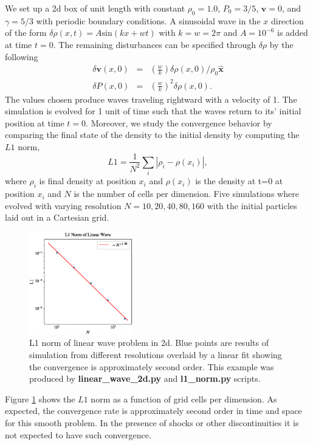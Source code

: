 We set up a 2d box of unit length with constant $\rho_0=1.0$, $P_0=3/5$, $\mathbf{v}=0$,
and $\gamma=5/3$ with periodic boundary conditions. A sinusoidal wave in the $x$ direction of 
the form $\delta\rho(x,t) = A\mathrm{sin}(kx + wt)$ with $k=w=2\pi$ and $A=10^{-6}$ is added at 
time $t=0$. The remaining disturbances can be specified through $\delta\rho$ by the following
\begin{equation}
	\begin{array}{rcl}
        \delta \mathbf{v}(x,0) & = & \left(\frac{w}{k}\right)\delta
        	\rho(x,0)/\rho_0\mathbf{\hat{x}}\\
        \delta P(x,0) & = & \left(\frac{w}{k}\right)^2\delta\rho(x,0).
    \end{array}
\end{equation}
The values chosen produce waves traveling rightward with a velocity of 1. The simulation is
evolved for 1 unit of time such that the waves return to its' initial position at time $t=0$. 
Moreover, we study the convergence behavior by comparing the final state of the density to 
the initial density by computing the $L1$ norm,
\begin{equation}
	L1 = \frac{1}{N^2}\sum_i \left| \rho_i - \rho(x_i) \right|,
\end{equation}
where $\rho_i$ is final density at position $x_i$ and $\rho(x_i)$ is the density at t=0
at position $x_i$ and $N$ is the number of cells per dimension. Five simulations where evolved
with varying resolution $N=10, 20, 40, 80, 160$ with the initial particles laid out in a
Cartesian grid.
\begin{figure}
    \begin{center}
        \includegraphics[width=0.4\textwidth]{figures/linear-wave-l1.eps}
        \caption{L1 norm of linear wave problem in 2d. Blue points are results
        of simulation from different resolutions overlaid by a linear fit showing
        the convergence is approximately second order. This example was produced by
        \textbf{linear\_wave\_2d.py} and \textbf{l1\_norm.py} scripts.}
        \label{fig.linear-wave}
    \end{center}
\end{figure}
Figure \ref{fig.linear-wave} shows the $L1$ norm as a function of grid cells per dimension.
As expected, the convergence rate is approximately second order in time and space for
this smooth problem. In the presence of shocks or other discontinuities it is not expected
to have such convergence.

